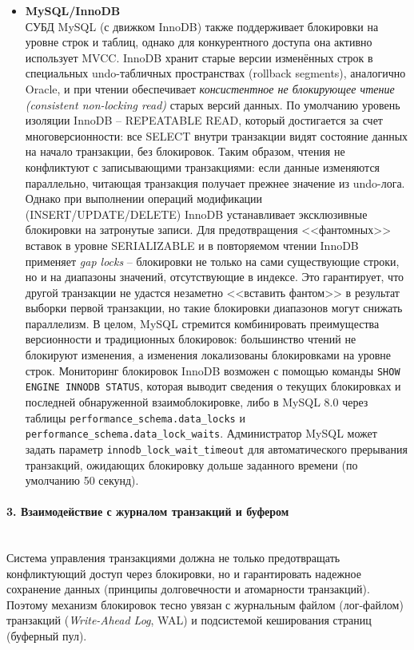 \begin{itemize}
    \item \textbf{MySQL/InnoDB} \autocite{Mysqldoc4} ~\\
   СУБД MySQL (с движком InnoDB) также поддерживает блокировки на уровне строк и таблиц, однако для конкурентного доступа она активно использует MVCC. InnoDB хранит старые версии изменённых строк в специальных undo-табличных пространствах (rollback segments), аналогично Oracle, и при чтении обеспечивает \textit{консистентное не блокирующее чтение (consistent non-locking read)} старых версий данных. По умолчанию уровень изоляции InnoDB – REPEATABLE READ, который достигается за счет многоверсионности: все SELECT внутри транзакции видят состояние данных на начало транзакции, без блокировок. Таким образом, чтения не конфликтуют с записывающими транзакциями: если данные изменяются параллельно, читающая транзакция получает прежнее значение из undo-лога. Однако при выполнении операций модификации (INSERT/UPDATE/DELETE) InnoDB устанавливает эксклюзивные блокировки на затронутые записи. Для предотвращения <<фантомных>> вставок в уровне SERIALIZABLE и в повторяемом чтении InnoDB применяет \textit{gap locks} – блокировки не только на сами существующие строки, но и на диапазоны значений, отсутствующие в индексе. Это гарантирует, что другой транзакции не удастся незаметно <<вставить фантом>> в результат выборки первой транзакции, но такие блокировки диапазонов могут снижать параллелизм. В целом, MySQL стремится комбинировать преимущества версионности и традиционных блокировок: большинство чтений не блокируют изменения, а изменения локализованы блокировками на уровне строк. Мониторинг блокировок InnoDB возможен с помощью команды \texttt{SHOW ENGINE INNODB STATUS}, которая выводит сведения о текущих блокировках и последней обнаруженной взаимоблокировке, либо в MySQL 8.0 через таблицы \texttt{performance\_schema.data\_locks} и \texttt{performance\_schema.data\_lock\_waits}. Администратор MySQL может задать параметр \texttt{innodb\_lock\_wait\_timeout} для автоматического прерывания транзакций, ожидающих блокировку дольше заданного времени (по умолчанию 50 секунд).
 \end{itemize}

\paragraph{3. Взаимодействие с журналом транзакций и буфером} ~\\

 Система управления транзакциями должна не только предотвращать конфликтующий доступ через блокировки, но и гарантировать надежное сохранение данных (принципы долговечности и атомарности транзакций). Поэтому механизм блокировок тесно увязан с журнальным файлом (лог-файлом) транзакций (\textit{Write-Ahead Log}, WAL) и подсистемой кеширования страниц (буферный пул). 
 
